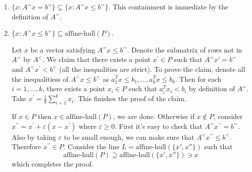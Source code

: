 \documentclass[11pt]{article}
\renewcommand{\leq}{\leqslant}
\renewcommand{\geq}{\geqslant}
\begin{document}
\begin{enumerate}[1)]
\begin{solution}
\begin{enumerate}
\item $\{x : A^= x = b^=\} \subseteq \{x : A^= x \leq b^=\}$. This containment is immediate by the definition of $A^=$. 

\item $\{x : A^= x \leq b^=\} \subseteq \text{affine-hull}(P)$. 


Let  $x$ be a vector satisfying $ A^= x \leq b^=$. 
Denote the submatrix of rows not in $A^=$ by $A^<$. 
We claim that there exists a point $x^\prime \in P$ such that $A^= x' = b^=$ and $A^< x^\prime < b^<$ (all the inequalities are strict). To prove the claim, denote all the inequalitiess of $A^< x\leq b^<$ as $a_1^T x \leq b_1, \dots, a_k^T x \leq b_k$. Then for each $i = 1, \dots, k$, there exists a point $x_i \in P$ such that $a_i^T x_i < b_i$ by definition of $A^=$. 
Take $x^\prime = \frac{1}{k} \sum_{i=1}^k x_i$. This finishes the proof of the claim.


If $x \in P$ then $x \in \text{affine-hull}(P)$, we are done. 
Otherwise if $x \notin P$, consider $x^{\prime\prime} = x^\prime + \varepsilon(x-x^\prime)$ where $\varepsilon\geq 0$. 
First it's easy to check that $A^= x^{\prime\prime} = b^=$.
Also by taking $\varepsilon$ to be small enough, we can make sure that $A^< x^{\prime\prime} \leq b^<$. Therefore $x^{\prime\prime} \in P$.
Consider the line $L = \text{affine-hull}(\{x', x''\})$ such that $$\text{affine-hull}(P) \supseteq \text{affine-hull}(\{x', x''\}) \ni x$$
which completes the proof.
\end{enumerate}

\end{solution}


\end{enumerate}



  
\end{document}
